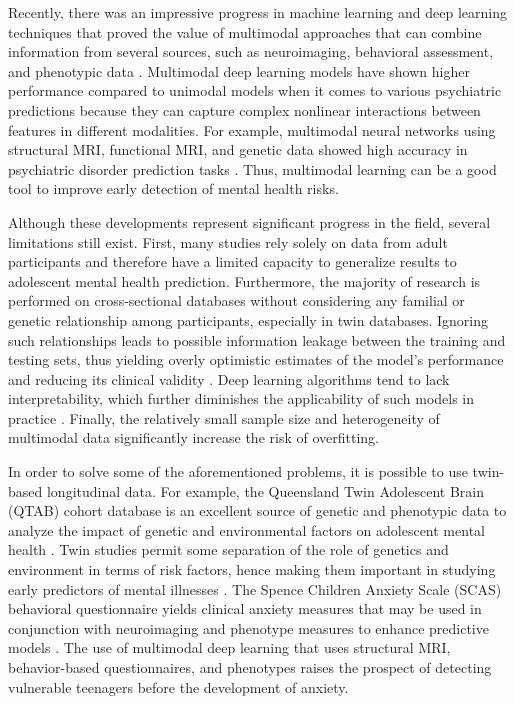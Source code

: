 \documentclass[10pt,letterpaper]{article}
\begin{document}
        
        
        Recently, there was an impressive progress in machine learning and deep learning techniques that proved the value of multimodal approaches that can combine information from several sources, such as neuroimaging, behavioral assessment, and phenotypic data \cite{ref1,ref25}. Multimodal deep learning models have shown higher performance compared to unimodal models when it comes to various psychiatric predictions because they can capture complex nonlinear interactions between features in different modalities. For example, multimodal neural networks using structural MRI, functional MRI, and genetic data showed high accuracy in psychiatric disorder prediction tasks \cite{ref25,ref39}. Thus, multimodal learning can be a good tool to improve early detection of mental health risks.




        Although these developments represent significant progress in the field, several limitations still exist. First, many studies rely solely on data from adult participants and therefore have a limited capacity to generalize results to adolescent mental health prediction. Furthermore, the majority of research is performed on cross-sectional databases without considering any familial or genetic relationship among participants, especially in twin databases. Ignoring such relationships leads to possible information leakage between the training and testing sets, thus yielding overly optimistic estimates of the model's performance and reducing its clinical validity \cite{ref32,ref33,ref34}. Deep learning algorithms tend to lack interpretability, which further diminishes the applicability of such models in practice \cite{ref15,ref16}. Finally, the relatively small sample size and heterogeneity of multimodal data significantly increase the risk of overfitting.



        In order to solve some of the aforementioned problems, it is possible to use twin-based longitudinal data. For example, the Queensland Twin Adolescent Brain (QTAB) cohort database is an excellent source of genetic and phenotypic data to analyze the impact of genetic and environmental factors on adolescent mental health \cite{ref32}. Twin studies permit some separation of the role of genetics and environment in terms of risk factors, hence making them important in studying early predictors of mental illnesses \cite{ref33,ref34}. The Spence Children Anxiety Scale (SCAS) behavioral questionnaire yields clinical anxiety measures that may be used in conjunction with neuroimaging and phenotype measures to enhance predictive models \cite{ref35}. The use of multimodal deep learning that uses structural MRI, behavior-based questionnaires, and phenotypes raises the prospect of detecting vulnerable teenagers before the development of anxiety.
\end{document}
